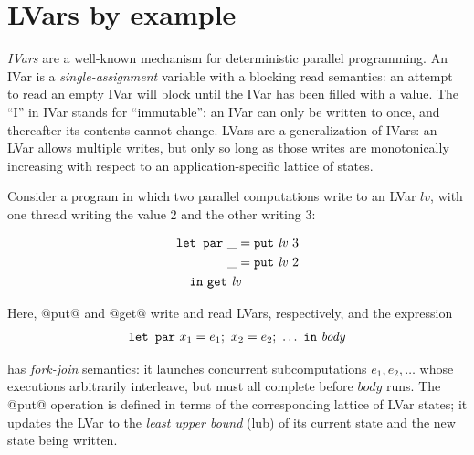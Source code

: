 \section{LVars by example}\label{s:lvars-examples}

\emph{IVars} \cite{IStructures, id, monad-par} are a well-known
mechanism for deterministic parallel programming.  An IVar is a
\emph{single-assignment} variable \cite{Tesler-1968} with a blocking
read semantics: an attempt to read an empty IVar will block until the
IVar has been filled with a value.  The ``I'' in IVar stands for
``immutable'': an IVar can only be written to once, and thereafter its
contents cannot change.  LVars are a generalization of IVars: an LVar
allows multiple writes, but only so long as those writes are
monotonically increasing with respect to an application-specific
lattice of states.

Consider a program in which two
parallel computations write to an LVar $\mathit{lv}$, with one thread
writing the value $2$ and the other writing $3$:

\vspace{-8mm}
\singlespacing
\begin{equation}
\begin{split}
& \LETPAR ~\_ = \putexp{\mathit{lv}}{3} \\
&  \letparspace ~\_ = \putexp{\mathit{lv}}{2} \\
&  \letspace \IN~ \GET~\mathit{lv}
\end{split}
\label{e:lvar-example-1}
\end{equation}
\doublespacing

Here, @put@ and @get@ write and read LVars,
respectively, and the expression
%
\vspace{-8mm}
\singlespacing
\begin{displaymath}
\mbox{\texttt{\mbox{\texttt{let}}~\mbox{\texttt{par}}}}~x_1=e_1;~x_2=e_2;~\dots~\mbox{\texttt{in}}~\mathit{body}
\end{displaymath}
\doublespacing

has \emph{fork-join} semantics: it launches concurrent subcomputations
$e_1, e_2, \dots$ whose executions arbitrarily interleave, but must
all complete before $\mathit{body}$ runs.  The @put@ operation is
defined in terms of the corresponding lattice of LVar states; it
updates the LVar to the \emph{least upper bound} (lub) of its
current state and the new state being written.

